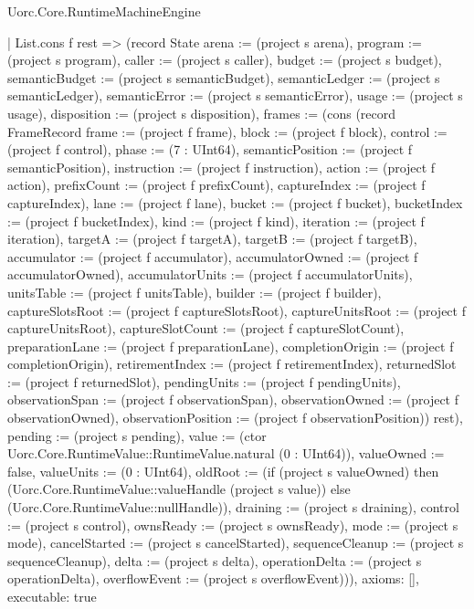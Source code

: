 \begin{lexlean}{Uorc.Core.RuntimeMachineEngine}
\begin{semanticmodule}
{    | List.cons f rest => (record State {arena := (project s arena), program := (project s program), caller := (project s caller), budget := (project s budget), semanticBudget := (project s semanticBudget), semanticLedger := (project s semanticLedger), semanticError := (project s semanticError), usage := (project s usage), disposition := (project s disposition), frames := (cons (record FrameRecord {frame := (project f frame), block := (project f block), control := (project f control), phase := (7 : UInt64), semanticPosition := (project f semanticPosition), instruction := (project f instruction), action := (project f action), prefixCount := (project f prefixCount), captureIndex := (project f captureIndex), lane := (project f lane), bucket := (project f bucket), bucketIndex := (project f bucketIndex), kind := (project f kind), iteration := (project f iteration), targetA := (project f targetA), targetB := (project f targetB), accumulator := (project f accumulator), accumulatorOwned := (project f accumulatorOwned), accumulatorUnits := (project f accumulatorUnits), unitsTable := (project f unitsTable), builder := (project f builder), captureSlotsRoot := (project f captureSlotsRoot), captureUnitsRoot := (project f captureUnitsRoot), captureSlotCount := (project f captureSlotCount), preparationLane := (project f preparationLane), completionOrigin := (project f completionOrigin), retirementIndex := (project f retirementIndex), returnedSlot := (project f returnedSlot), pendingUnits := (project f pendingUnits), observationSpan := (project f observationSpan), observationOwned := (project f observationOwned), observationPosition := (project f observationPosition)}) rest), pending := (project s pending), value := (ctor Uorc.Core.RuntimeValue::RuntimeValue.natural (0 : UInt64)), valueOwned := false, valueUnits := (0 : UInt64), oldRoot := (if (project s valueOwned) then (Uorc.Core.RuntimeValue::valueHandle (project s value)) else (Uorc.Core.RuntimeValue::nullHandle)), draining := (project s draining), control := (project s control), ownsReady := (project s ownsReady), mode := (project s mode), cancelStarted := (project s cancelStarted), sequenceCleanup := (project s sequenceCleanup), delta := (project s delta), operationDelta := (project s operationDelta), overflowEvent := (project s overflowEvent)})),
  axioms: [],
  executable: true
}


\end{semanticmodule}
\end{lexlean}
